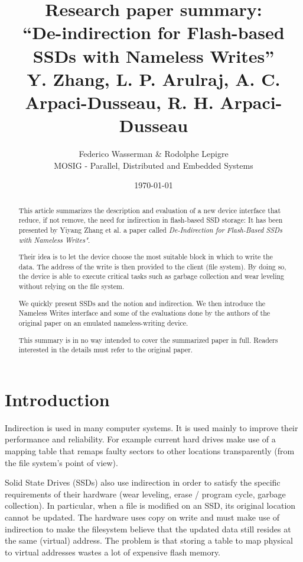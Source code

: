 \documentclass[twocolumn,a4paper,10pt]{article}
\begin{document}
\title{Research paper summary:\\
       ``De-indirection for Flash-based SSDs with Nameless Writes''\\
       \small{Y. Zhang, L. P. Arulraj, A. C. Arpaci-Dusseau, R. H. Arpaci-Dusseau}}
\author{Federico Wasserman \& Rodolphe Lepigre\\
        MOSIG - Parallel, Distributed and Embedded Systems}
\date{\today}
\maketitle

\begin{abstract}
This article summarizes the description and evaluation of a new device
interface that reduce, if not remove, the need for indirection in flash-based
SSD storage: It has been presented by Yiyang Zhang et al. a paper called
\textit{De-Indirection for Flash-Based SSDs with Nameless Writes"}.

Their idea is to let the device choose the most suitable block in which to
write the data. The address of the write is then provided to the client (file
system). By doing so, the device is able to execute critical tasks such as
garbage collection and wear leveling without relying on the file system.

We quickly present SSDs and the notion and indirection. We then introduce
the Nameless Writes interface and some of the evaluations done by the authors
of the original paper on an emulated nameless-writing device.

This summary is in no way intended to cover the summarized paper in full.
Readers interested in the details must refer to the original paper.
\end{abstract}

\section*{Introduction}
Indirection is used in many computer systems. It is used mainly to improve
their performance and reliability. For example current hard drives make use of
a mapping table that remaps faulty sectors to other locations transparently
(from the file system's point of view).

Solid State Drives (SSDs) also use indirection in order to satisfy the
specific requirements of their hardware (wear leveling, erase / program
cycle, garbage collection). In particular, when a file is modified on an SSD,
its original location cannot be updated. The hardware uses copy on write and
must make use of indirection to make the filesystem believe that the updated
data still resides at the same (virtual) address. The problem is that storing
a table to map physical to virtual addresses wastes a lot of expensive flash
memory.
\end{document}
